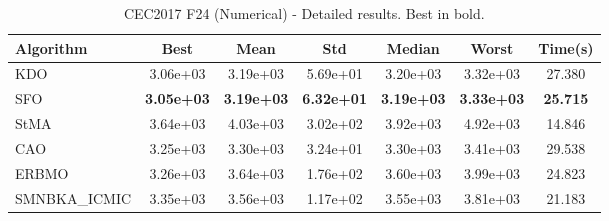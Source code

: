 \begin{table}[H]
\centering\small
\caption{CEC2017 F24 (Numerical) - Detailed results. Best in bold.}
\label{tab:cec2017_F24}
\begin{tabular}{lcccccc}
\toprule
\textbf{Algorithm} & \textbf{Best} & \textbf{Mean} & \textbf{Std} & \textbf{Median} & \textbf{Worst} & \textbf{Time(s)} \\
\midrule
KDO & 3.06e+03 & 3.19e+03 & 5.69e+01 & 3.20e+03 & 3.32e+03 & 27.380 \\
SFO & \textbf{3.05e+03} & \textbf{3.19e+03} & \textbf{6.32e+01} & \textbf{3.19e+03} & \textbf{3.33e+03} & \textbf{25.715} \\
StMA & 3.64e+03 & 4.03e+03 & 3.02e+02 & 3.92e+03 & 4.92e+03 & 14.846 \\
CAO & 3.25e+03 & 3.30e+03 & 3.24e+01 & 3.30e+03 & 3.41e+03 & 29.538 \\
ERBMO & 3.26e+03 & 3.64e+03 & 1.76e+02 & 3.60e+03 & 3.99e+03 & 24.823 \\
SMNBKA_ICMIC & 3.35e+03 & 3.56e+03 & 1.17e+02 & 3.55e+03 & 3.81e+03 & 21.183 \\
\bottomrule
\end{tabular}
\end{table}
